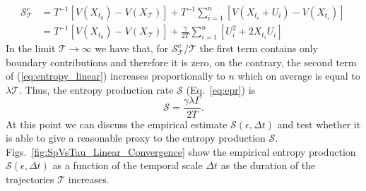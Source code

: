 \documentclass[12pt]{iopart}
\newcommand{\lx} {\left}
\newcommand{\rx} {\right}
\newcommand{\cP} {\mathcal{P}}
\newcommand{\cS} {\mathcal{S}}
\newcommand{\cT} {\mathcal{T}}
\begin{document}
\begin{align}
   \cS_\cT^{c}&=T^{-1}\lx[V(X_{t_{0}})-V(X_{\cT})\rx] +T^{-1}\sum_{i=1}^n\lx[V(X_{t_{i}}+U_i)-V(X_{t_i})\rx]\,\nonumber \\
   &=T^{-1}\lx[V(X_{t_{0}})-V(X_{\cT})\rx]+\frac{\gamma}{2T}\sum_{i=1}^n\lx[U_i^2+2X_{t_i}U_i\rx]
   \label{eq:entropy_linear}
\end{align}
In the limit $\cT \to \infty$ we have that, for $\cS_\cT^{c}/\cT$ the first term contains only boundary contributions and therefore it is zero, on the contrary, the second term of (\ref{eq:entropy_linear}) increases proportionally to $n$ which on average is equal to $\lambda \cT$. Thus, the entropy production rate $\cS$ (Eq.~\ref{eq:epr}) is
\begin{equation}
\cS=\frac{\gamma\lambda\Gamma}{2T}.
\end{equation}
At this point we can discuss the empirical estimate $\cS(\epsilon,\Delta t)$ and test whether it is able to give a reasonable proxy to the entropy production $\cS$. Figs.~\ref{fig:SpVsTau_Linear_Convergence} show the empirical entropy production $\cS(\epsilon,\Delta t)$ as a function of the temporal scale $\Delta t$ as the duration of the trajectories $\cT$ increases. 
\end{document}
